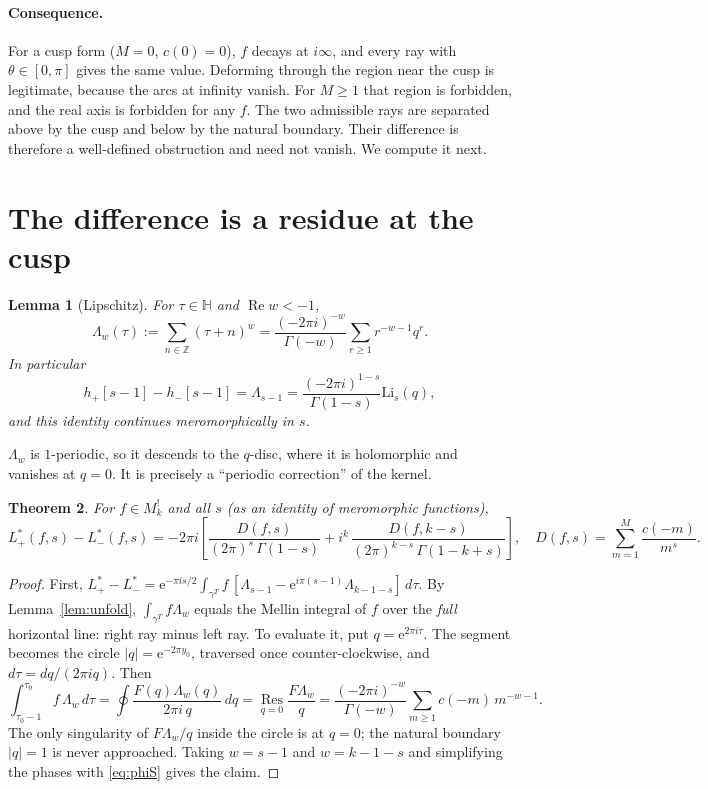 \documentclass[11pt]{article}
\newtheorem{theorem}{Theorem}
\newtheorem{lemma}[theorem]{Lemma}
\theoremstyle{definition}
\theoremstyle{remark}
\newcommand{\HH}{\mathbb{H}}
\newcommand{\ZZ}{\mathbb{Z}}
\newcommand{\Li}{\mathrm{Li}}
\newcommand{\e}{\mathrm{e}}
\begin{document}
\paragraph{Consequence.}
For a cusp form ($M=0$, $c(0)=0$), $f$ decays at $i\infty$, and every ray with
$\theta\in[0,\pi]$ gives the same value. Deforming through the region near the cusp is
legitimate, because the arcs at infinity vanish. For $M\ge1$ that region is forbidden,
and the real axis is forbidden for any $f$. The two admissible rays are separated above
by the cusp and below by the natural boundary. Their difference is therefore a
well-defined obstruction and need not vanish. We compute it next.

\section{The difference is a residue at the cusp}

\begin{lemma}[Lipschitz]\label{lem:lip}
For $\tau\in\HH$ and $\operatorname{Re}w<-1$,
\[
\Lambda_w(\tau):=\sum_{n\in\ZZ}(\tau+n)^w=\frac{(-2\pi i)^{-w}}{\Gamma(-w)}\sum_{r\ge1}r^{-w-1}q^r .
\]
In particular
\[
h_+[s-1]-h_-[s-1]=\Lambda_{s-1}=\frac{(-2\pi i)^{1-s}}{\Gamma(1-s)}\Li_s(q),
\]
and this identity continues meromorphically in $s$.
\end{lemma}

$\Lambda_w$ is $1$-periodic, so it descends to the $q$-disc, where it is holomorphic and
vanishes at $q=0$. It is precisely a ``periodic correction'' of the kernel.

\begin{theorem}\label{thm:main}
For $f\in M^!_k$ and all $s$ (as an identity of meromorphic functions),
\[
L^*_+(f,s)-L^*_-(f,s)=-2\pi i\left[\frac{D(f,s)}{(2\pi)^s\,\Gamma(1-s)}
+i^k\,\frac{D(f,k-s)}{(2\pi)^{k-s}\,\Gamma(1-k+s)}\right],\quad
D(f,s)=\sum_{m=1}^{M}\frac{c(-m)}{m^{s}}.
\]
\end{theorem}
\begin{proof}
First, $L^*_+-L^*_-=\e^{-\pi is/2}\int_{\gamma^T}f\,[\Lambda_{s-1}-\e^{i\pi(s-1)}\Lambda_{k-1-s}]\,d\tau$.
By Lemma~\ref{lem:unfold}, $\int_{\gamma^T}f\Lambda_w$ equals the Mellin integral of $f$ over
the \emph{full} horizontal line: right ray minus left ray. To evaluate it, put
$q=\e^{2\pi i\tau}$. The segment becomes the circle $|q|=\e^{-2\pi y_0}$, traversed once
counter-clockwise, and $d\tau=dq/(2\pi i q)$. Then
\[
\int_{\tau_0-1}^{\tau_0}f\,\Lambda_w\,d\tau=\oint\frac{F(q)\Lambda_w(q)}{2\pi i\,q}\,dq
=\operatorname*{Res}_{q=0}\frac{F\Lambda_w}{q}
=\frac{(-2\pi i)^{-w}}{\Gamma(-w)}\sum_{m\ge1}c(-m)\,m^{-w-1}.
\]
The only singularity of $F\Lambda_w/q$ inside the circle is at $q=0$; the natural
boundary $|q|=1$ is never approached. Taking $w=s-1$ and $w=k-1-s$ and simplifying the
phases with \eqref{eq:phiS} gives the claim.
\end{proof}
\end{document}
